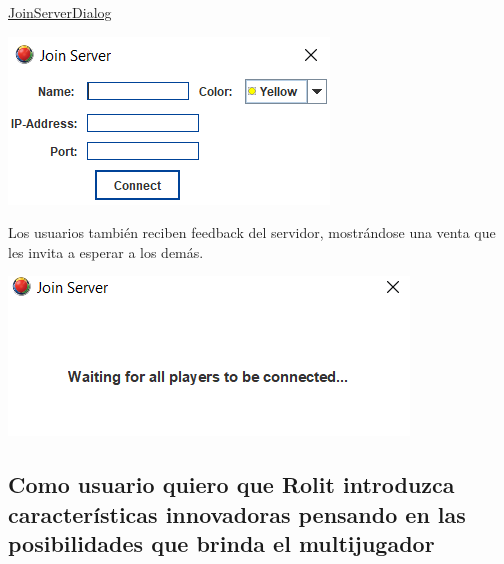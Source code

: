 \documentclass{article}
\theoremstyle{break}
\begin{document}
\underline{JoinServerDialog}
\begin{center}
\includegraphics[scale=1]{join-server-sprint-6.png}
\end{center}

Los usuarios también reciben feedback del servidor, mostrándose una venta que les invita a esperar a los demás.

\begin{center}
\includegraphics[scale=0.85]{user-feedback.png}
\end{center}

\subsection{Como usuario quiero que Rolit introduzca características innovadoras pensando en las posibilidades que brinda el multijugador}
\end{document}
